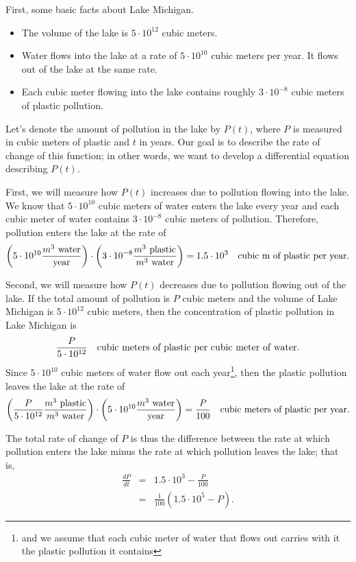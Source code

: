 First, some basic facts about Lake Michigan.
\begin{itemize}
  \item The volume of the lake is
    $5\cdot10^{12}$ cubic meters.
  \item Water flows into the lake at a rate of
    $5\cdot10^{10}$ cubic meters per year.  It flows out of the lake
    at the same rate.
  \item Each cubic meter flowing
    into the lake contains roughly $3\cdot10^{-8}$ cubic meters of
    plastic pollution.
\end{itemize}

Let's denote the amount of pollution in the lake by $P(t)$, where $P$
is measured in cubic meters of plastic and $t$ in years.  Our goal
is to describe the rate of change of this function;  in other
words, we want to develop a differential equation describing $P(t)$.

First, we will measure how $P(t)$ increases due to pollution flowing
into the lake.  We know that $5\cdot10^{10}$ cubic meters of water
enters the lake every year and each cubic meter of water contains
$3\cdot10^{-8}$ cubic meters of pollution.  Therefore, pollution
enters the lake at the rate of
$$
\left(5\cdot 10^{10} \frac{m^3 \mbox{\ water}}{\mbox{year}}\right) \cdot \left(3\cdot10^{-8} \frac{m^3 \mbox{\ plastic}}{m^3 \mbox{\ water}} \right) = 1.5\cdot 10^3\quad
\hbox{cubic m of plastic per year}.
$$

Second, we will measure how $P(t)$ decreases due to pollution flowing
out of the lake.  If the total amount of pollution is $P$ cubic
meters and the volume of Lake Michigan is $5\cdot 10^{12}$ cubic
meters, then the concentration of plastic pollution in Lake Michigan is
$$
\frac{P}{5\cdot10^{12}} \quad \hbox{cubic meters of plastic per cubic meter of water}.
$$
Since $5\cdot10^{10}$ cubic meters of water flow out each year\footnote{and we assume that each cubic meter of water that flows out carries with it the plastic pollution it contains}, then
the plastic pollution leaves the lake at the rate of
$$
\left(\frac{P}{5\cdot10^{12}} \frac{m^3 \mbox{\ plastic}}{m^3 \mbox{\ water}} \right) \cdot \left(5\cdot10^{10} \frac{m^3 \mbox{\ water}}{\mbox{year}} \right)=\frac{P}{100} 
\quad \hbox{cubic meters of plastic
  per year}.
$$

The total rate of change of $P$ is thus the difference between the rate at which
pollution enters the lake minus the rate at which pollution leaves the
lake;  that is,
\begin{eqnarray*}
\frac{dP}{dt} & = &1.5\cdot10^{3}-\frac{P}{100} \\
                   & = & \frac{1}{100}(1.5\cdot10^{5} - P).
\end{eqnarray*}

